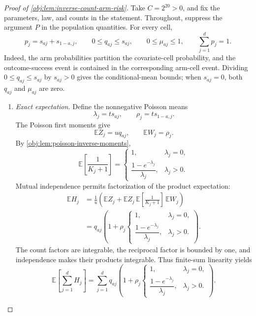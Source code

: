 \begin{proof}[Proof of \cref{obj:lem:inverse-count-arm-risk}]
Take \(C=2^{20}>0\), and fix the parameters, law, and counts in the statement. Throughout, suppress the argument \(P\) in the population quantities. For every cell,
\[
p_j=s_{aj}+s_{1-a,j},\qquad
0\le q_{aj}\le s_{aj},\qquad
0\le\mu_{aj}\le1,\qquad
\sum_{j=1}^{d}p_j=1.
\]
Indeed, the arm probabilities partition the covariate-cell probability, and the outcome-success event is contained in the corresponding arm-cell event. Dividing \(0\le q_{aj}\le s_{aj}\) by \(s_{aj}>0\) gives the conditional-mean bounds; when \(s_{aj}=0\), both \(q_{aj}\) and \(\mu_{aj}\) are zero.

\begin{enumerate}
\item \emph{Exact expectation.}
Define the nonnegative Poisson means
\[
\lambda_j=t s_{aj},\qquad \rho_j=t s_{1-a,j}.
\]
The Poisson first moments give
\[
\mathbb E Z_j=u q_{aj},\qquad \mathbb E W_j=\rho_j.
\]
By \cref{obj:lem:poisson-inverse-moments},
\[
\mathbb E\!\left[\frac1{K_j+1}\right]
=
\begin{cases}
1,&\lambda_j=0,\\[2pt]
\dfrac{1-e^{-\lambda_j}}{\lambda_j},&\lambda_j>0.
\end{cases}
\]
Mutual independence permits factorization of the product expectation:
\[
\begin{aligned}
\mathbb E H_j
&=\frac1u\left(
\mathbb E Z_j+
\mathbb E Z_j\,
\mathbb E\!\left[\frac1{K_j+1}\right]\,
\mathbb E W_j\right)\\
&=q_{aj}\left(1+\rho_j
\begin{cases}
1,&\lambda_j=0,\\[2pt]
\dfrac{1-e^{-\lambda_j}}{\lambda_j},&\lambda_j>0.
\end{cases}\right).
\end{aligned}
\]
The count factors are integrable, the reciprocal factor is bounded by one, and independence makes their products integrable. Thus finite-sum linearity yields
\[
\mathbb E\!\left[\sum_{j=1}^{d}H_j\right]
=
\sum_{j=1}^{d}q_{aj}\left(1+\rho_j
\begin{cases}
1,&\lambda_j=0,\\[2pt]
\dfrac{1-e^{-\lambda_j}}{\lambda_j},&\lambda_j>0.
\end{cases}\right).
\]


\end{enumerate}
\end{proof}
